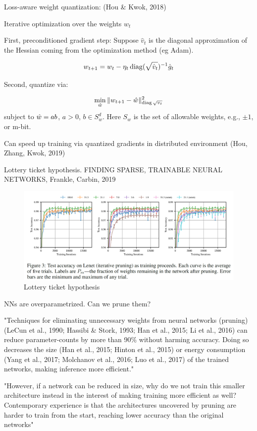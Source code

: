 \documentclass[english]{article}
\begin{document}
Loss-aware weight quantization: (Hou \& Kwok, 2018)

Iterative optimization over the weights $w_t$

First, preconditioned gradient step: Suppose $\hat v_t$ is the diagonal approximation of the Hessian coming from the optimization method (eg Adam).

$$w_{t+1} = w_t - \eta_t \operatorname{diag}(\sqrt{\hat v_t})^{-1}\hat g_t$$

Second, quantize via: 

$$\min_{\hat{w}}\| w_{t+1} - \hat{w} \|^2_{\operatorname{diag}{\sqrt{v_t}}}$$ subject to $\hat{w} = ab$, $a>0$, $b\in S_w^d$. Here $S_w$ is the set of allowable weights, e.g., $\pm 1$, or m-bit.


Can speed up training via quantized gradients in distributed environment (Hou, Zhang, Kwok, 2019)

\item Lottery ticket hypothesis. FINDING SPARSE, TRAINABLE NEURAL NETWORKS, Frankle, Carbin, 2019

\begin{figure}
  \centering
  \includegraphics[width=\textwidth]{lot.png}
  \caption{Lottery ticket hypothesis}
  \label{lot}
\end{figure}

NNs are overparametrized. Can we prune them?

"Techniques for eliminating unnecessary weights from neural networks (pruning) (LeCun et al., 1990;
Hassibi \& Stork, 1993; Han et al., 2015; Li et al., 2016) can reduce parameter-counts by more than
90\% without harming accuracy. Doing so decreases the size (Han et al., 2015; Hinton et al., 2015)
or energy consumption (Yang et al., 2017; Molchanov et al., 2016; Luo et al., 2017) of the trained
networks, making inference more efficient." 

"However, if a network can be reduced in size, why do we
not train this smaller architecture instead in the interest of making training more efficient as well?
Contemporary experience is that the architectures uncovered by pruning are harder to train from the
start, reaching lower accuracy than the original networks"
\end{document}
